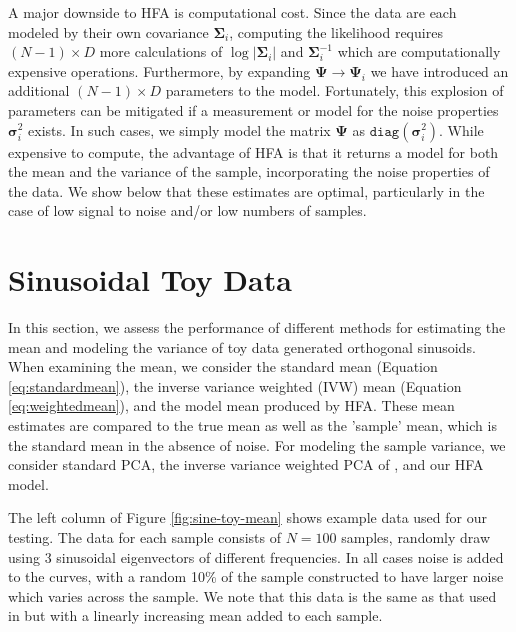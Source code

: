 \documentclass[12pt,preprint]{aastex}
\newcommand{\mbf}[1]{\boldsymbol{#1}}
\newcommand{\ps}{\mbf{\Psi}}
\newcommand{\sig}{\mbf{\Sigma}}
\newcommand{\var}{\mbf{\sigma}^2}
\begin{document}
A major downside to HFA is computational cost.  Since the data are each modeled by their 
own covariance $\sig_i$, computing the likelihood requires $(N-1) \times D$ more 
calculations of $\log|\sig_i|$ and $\sig_i^{-1}$ which are computationally expensive operations.
Furthermore, by expanding $\ps \rightarrow \ps_i$ we have introduced an 
additional $(N-1) \times D$ parameters to the model.  Fortunately, this explosion of 
parameters can be mitigated if a measurement or model for the noise properties $\var_i$ 
exists.  In such cases, we simply model the matrix $\ps$ as $\mathtt{diag}(\var_i)$.
While expensive to compute, the advantage of HFA is that it returns a model for both the mean 
and the variance of the sample, incorporating the noise properties of the data.  We show below 
that these estimates are optimal, particularly in the case of low signal to noise and/or low 
numbers of samples.

\section{Sinusoidal Toy Data}
\label{sec:sine}

In this section, we assess the performance of different methods for estimating the mean 
and modeling the variance of toy data generated orthogonal sinusoids.  When examining 
the mean, we consider the standard mean (Equation \ref{eq:standardmean}), the 
inverse variance weighted (IVW) mean (Equation \ref{eq:weightedmean}), and the model mean 
produced by HFA.  These mean estimates are compared to the true mean as well as the 
'sample' mean, which is the standard mean in the absence of noise.  For modeling the 
sample variance, we consider standard PCA, the inverse variance weighted PCA of 
\citet{bailey12}, and our HFA model.

The left column of Figure \ref{fig:sine-toy-mean} shows example data used for our testing.  The 
data for each sample consists of $N=100$ samples, randomly draw using 3 sinusoidal 
eigenvectors of different frequencies.  In all cases noise is added to the curves, with a 
random 10\% of the sample constructed to have larger noise which varies across the 
sample.  We note that this data is the same as that used in \citet{bailey12} but with a linearly 
increasing mean added to each sample.  
\end{document}

